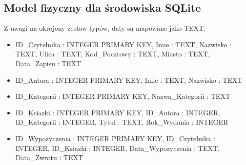 \documentclass[a4paper,11pt,english,openany,oneside]{sphinxmanual}
\begin{document}
\subsection{Model fizyczny dla środowiska SQLite}
\label{\detokenize{rozdzial_3/index:model-fizyczny-dla-srodowiska-sqlite}}
\sphinxAtStartPar
Z uwagi na okrojony zestaw typów, daty są mapowane jako TEXT.
\begin{itemize}
\item {} 
\sphinxAtStartPar
{} ID\_Czytelnika : INTEGER PRIMARY KEY, Imie : TEXT, Nazwisko : TEXT, Ulica : TEXT, Kod\_Pocztowy : TEXT, Miasto : TEXT, Data\_Zapisu : TEXT

\item {} 
\sphinxAtStartPar
{} ID\_Autora : INTEGER PRIMARY KEY, Imie : TEXT, Nazwisko : TEXT

\item {} 
\sphinxAtStartPar
{} ID\_Kategorii : INTEGER PRIMARY KEY, Nazwa\_Kategorii : TEXT

\item {} 
\sphinxAtStartPar
{} ID\_Ksiazki : INTEGER PRIMARY KEY, ID\_Autora : INTEGER, ID\_Kategorii : INTEGER, Tytul : TEXT, Rok\_Wydania : INTEGER

\item {} 
\sphinxAtStartPar
{} ID\_Wypozyczenia : INTEGER PRIMARY KEY, ID\_Czytelnika : INTEGER, ID\_Ksiazki : INTEGER, Data\_Wypozyczenia : TEXT, Data\_Zwrotu : TEXT

\end{itemize}

\noindent{}
\end{document}
